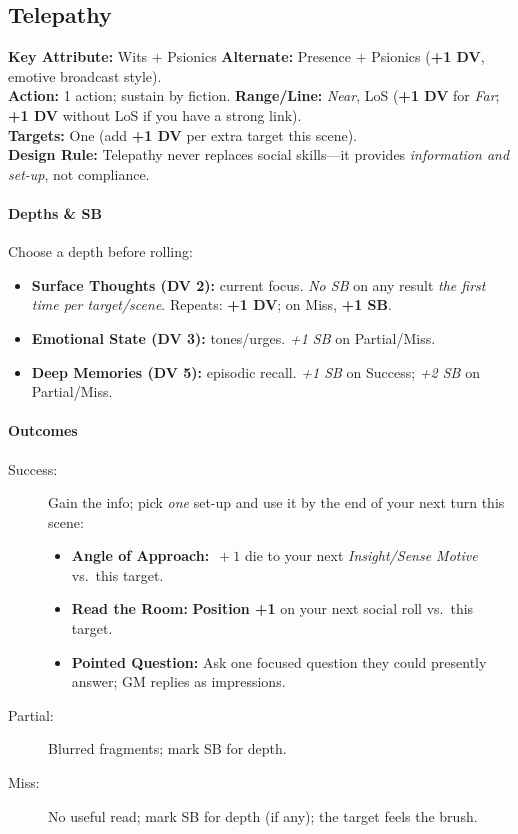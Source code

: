 \documentclass[11pt,twoside]{article}
\begin{document}

\subsection{Telepathy}
\textbf{Key Attribute:} Wits $+$ Psionics \quad
\textbf{Alternate:} Presence $+$ Psionics (\textbf{+1 DV}, emotive broadcast style). \\
\textbf{Action:} 1 action; sustain by fiction. \quad
\textbf{Range/Line:} \textit{Near}, LoS (\textbf{+1 DV} for \textit{Far}; \textbf{+1 DV} without LoS if you have a strong link). \\
\textbf{Targets:} One (add \textbf{+1 DV} per extra target this scene). \\
\textbf{Design Rule:} Telepathy never replaces social skills---it provides \emph{information and set-up}, not compliance.

\paragraph*{Depths \& SB}
Choose a depth before rolling:
\begin{itemize}[leftmargin=*]
  \item \textbf{Surface Thoughts (DV 2):} current focus. \emph{No SB} on any result \emph{the first time per target/scene}. Repeats: \textbf{+1 DV}; on Miss, \textbf{+1 SB}.
  \item \textbf{Emotional State (DV 3):} tones/urges. \emph{+1 SB} on Partial/Miss.
  \item \textbf{Deep Memories (DV 5):} episodic recall. \emph{+1 SB} on Success; \emph{+2 SB} on Partial/Miss.
\end{itemize}

\paragraph*{Outcomes}
\begin{description}
  \item[Success:] Gain the info; pick \emph{one} set-up and use it by the end of your next turn this scene:
  \begin{itemize}
    \item \textbf{Angle of Approach:} \(\,+1\) die to your next \emph{Insight/Sense Motive} vs.\ this target.
    \item \textbf{Read the Room:} \textbf{Position +1} on your next social roll vs.\ this target.
    \item \textbf{Pointed Question:} Ask one focused question they could presently answer; GM replies as impressions.
  \end{itemize}
  \item[Partial:] Blurred fragments; mark SB for depth.
  \item[Miss:] No useful read; mark SB for depth (if any); the target feels the brush.
\end{description}
\end{document}
